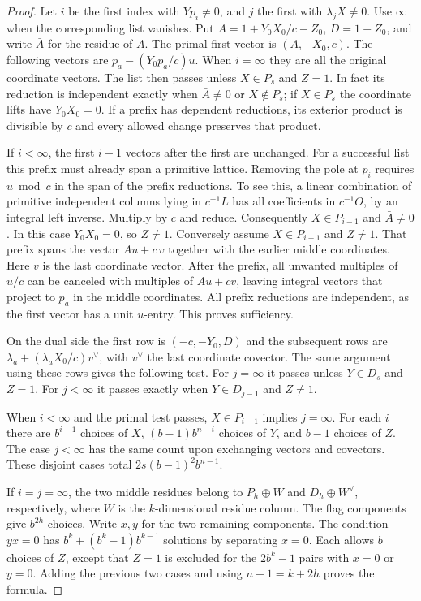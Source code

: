 \documentclass[a4paper,11pt]{article}
\theoremstyle{definition}
\theoremstyle{remark}
\numberwithin{equation}{section}
\begin{document}
\begin{proof}
Let \(i\) be the first index with \(Yp_i\ne0\), and \(j\)
the first with \(\lambda_j X\ne0\). Use \(\infty\) when the
corresponding list vanishes. Put
\(A=1+Y_0X_0/c-Z_0\), \(D=1-Z_0\), and write \(\bar A\)
for the residue of \(A\).
The primal first vector is \((A,-X_0,c)\).
The following vectors are \(p_a-(Y_0p_a/c)u\).
When \(i=\infty\) they are all the original coordinate vectors.
The list then passes unless \(X\in P_s\) and \(Z=1\).
In fact its reduction is independent exactly when
\(\bar A\ne0\) or \(X\notin P_s\); if \(X\in P_s\) the
coordinate lifts have \(Y_0X_0=0\). If a prefix has dependent
reductions, its exterior product is divisible by \(c\) and
every allowed change preserves that product.

If \(i<\infty\), the first \(i-1\) vectors after the
first are unchanged. For a successful list this prefix
must already span a primitive lattice. Removing the pole
at \(p_i\) requires \(u\bmod c\) in the span of the prefix
reductions. To see this, a linear combination of primitive
independent columns lying in \(c^{-1}L\) has all coefficients
in \(c^{-1}O\), by an integral left inverse. Multiply by
\(c\) and reduce. Consequently \(X\in P_{i-1}\) and
\(\bar A\ne0\). In this case \(Y_0X_0=0\), so \(Z\ne1\).
Conversely assume \(X\in P_{i-1}\) and \(Z\ne1\).
That prefix spans the vector \(Au+c\,v\) together with the
earlier middle coordinates. Here \(v\) is the last coordinate
vector. After the prefix, all unwanted multiples of \(u/c\)
can be canceled with multiples of \(Au+cv\), leaving integral
vectors that project to \(p_a\) in the middle coordinates.
All prefix reductions are independent, as the first vector
has a unit \(u\)-entry. This proves sufficiency.

On the dual side the first row is \((-c,-Y_0,D)\)
and the subsequent rows are
\(\lambda_a+(\lambda_aX_0/c)v^\vee\), with \(v^\vee\) the
last coordinate covector. The same argument using these rows
gives the following test. For \(j=\infty\) it passes unless
\(Y\in D_s\) and \(Z=1\). For \(j<\infty\) it passes
exactly when \(Y\in D_{j-1}\) and \(Z\ne1\).

When \(i<\infty\) and the primal test passes, \(X\in P_{i-1}\)
implies \(j=\infty\). For each \(i\) there are \(b^{i-1}\)
choices of \(X\), \((b-1)b^{n-i}\) choices of \(Y\), and
\(b-1\) choices of \(Z\). The case \(j<\infty\) has the same
count upon exchanging vectors and covectors. These disjoint
cases total \(2s(b-1)^2b^{n-1}\).

If \(i=j=\infty\), the two middle residues belong to
\(P_h\oplus W\) and \(D_h\oplus W^\vee\), respectively,
where \(W\) is the \(k\)-dimensional residue column.
The flag components give \(b^{2h}\) choices.
Write \(x,y\) for the two remaining components.
The condition \(yx=0\) has \(b^k+(b^k-1)b^{k-1}\) solutions
by separating \(x=0\). Each allows \(b\) choices of \(Z\),
except that \(Z=1\) is excluded for the \(2b^k-1\) pairs
with \(x=0\) or \(y=0\). Adding the previous two cases and
using \(n-1=k+2h\) proves the formula.
\end{proof}
\end{document}
